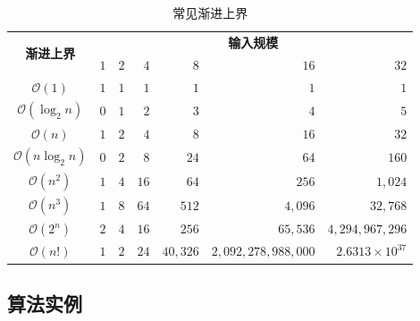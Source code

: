 \begin{frame}{\insertsubsectionhead}
    \begin{table}[h]
        \small
        \centering
        \caption{常见渐进上界}
        \begin{tabular}{c|rrrrrr}
            \toprule
            \multirow{2}{*}{\textbf{渐进上界}} & \multicolumn{6}{c}{\textbf{输入规模}}                                                                       \\
                                           & $1$                               & $2$ & $4$  & $8$      & $16$                & $32$                  \\
            \midrule
            $\mathcal{O}(1)$               & $1$                               & $1$ & $1$  & $1$      & $1$                 & $1$                   \\
            $\mathcal{O}(\log_{2}n)$       & $0$                               & $1$ & $2$  & $3$      & $4$                 & $5$                   \\
            $\mathcal{O}(n)$               & $1$                               & $2$ & $4$  & $8$      & $16$                & $32$                  \\
            $\mathcal{O}(n\log_{2}n)$      & $0$                               & $2$ & $8$  & $24$     & $64$                & $160$                 \\
            $\mathcal{O}(n^{2})$           & $1$                               & $4$ & $16$ & $64$     & $256$               & $1,024$               \\
            $\mathcal{O}(n^{3})$           & $1$                               & $8$ & $64$ & $512$    & $4,096$             & $32,768$              \\
            \midrule
            $\mathcal{O}(2^{n})$           & $2$                               & $4$ & $16$ & $256$    & $65,536$            & $4,294,967,296$       \\
            $\mathcal{O}(n!)$              & $1$                               & $2$ & $24$ & $40,326$ & $2,092,278,988,000$ & $2.6313\times10^{37}$ \\
            \bottomrule
        \end{tabular}
        \label{tab:asymptotic_upper_bound}
    \end{table}
\end{frame}

\subsection{算法实例}

